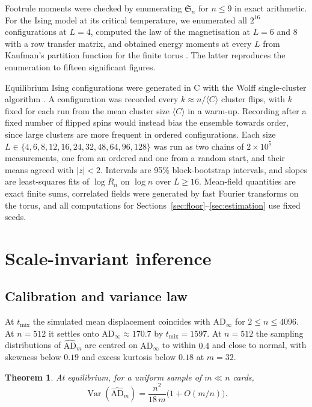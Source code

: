 \documentclass[ba]{imsart}
\theoremstyle{plain}
\newtheorem{theorem}{Theorem}[section]
\theoremstyle{definition}
\newcommand{\Var}{\operatorname{Var}}
\newcommand{\AD}{\mathrm{AD}}
\newcommand{\ADh}{\widehat{\mathrm{AD}}}
\newcommand{\Sym}{\mathfrak{S}}
\begin{document}
Footrule moments were checked by enumerating $\Sym_n$ for $n\le9$ in exact arithmetic. For the Ising model at its critical temperature, we enumerated all $2^{16}$ configurations at $L=4$, computed the law of the magnetisation at $L=6$ and $8$ with a row transfer matrix, and obtained energy moments at every $L$ from Kaufman's partition function for the finite torus \citep{FerdinandFisher1969,Kaufman1949}. The latter reproduces the enumeration to fifteen significant figures.

Equilibrium Ising configurations were generated in C with the Wolff single-cluster algorithm \citep{Wolff1989}. A configuration was recorded every $k\approx n/\langle C\rangle$ cluster flips, with $k$ fixed for each run from the mean cluster size $\langle C\rangle$ in a warm-up. Recording after a fixed number of flipped spins would instead bias the ensemble towards order, since large clusters are more frequent in ordered configurations. Each size $L\in\{4,6,8,12,16,24,32,48,64,96,128\}$ was run as two chains of $2\times10^5$ measurements, one from an ordered and one from a random start, and their means agreed with $|z|<2$. Intervals are 95\% block-bootstrap intervals, and slopes are least-squares fits of $\log R_n$ on $\log n$ over $L\ge16$. Mean-field quantities are exact finite sums, correlated fields were generated by fast Fourier transforms on the torus, and all computations for Sections~\ref{sec:floor}--\ref{sec:estimation} use fixed seeds.

\section{Scale-invariant inference}\label{sec:scale}

\subsection{Calibration and variance law}

At $t_{\mathrm{mix}}$ the simulated mean displacement coincides with $\AD_\infty$ for $2\le n\le4096$. At $n=512$ it settles onto $\AD_\infty\approx170.7$ by $t_{\mathrm{mix}}=1597$. At $n=512$ the sampling distributions of $\ADh_m$ are centred on $\AD_\infty$ to within $0.4$ and close to normal, with skewness below $0.19$ and excess kurtosis below $0.18$ at $m=32$.

\begin{theorem}\label{thm:variance}
At equilibrium, for a uniform sample of $m\ll n$ cards,
\begin{equation}\label{eq:variance}
\Var(\ADh_m)=\frac{n^2}{18\,m}\bigl(1+O(m/n)\bigr).
\end{equation}
\end{theorem}
\end{document}
